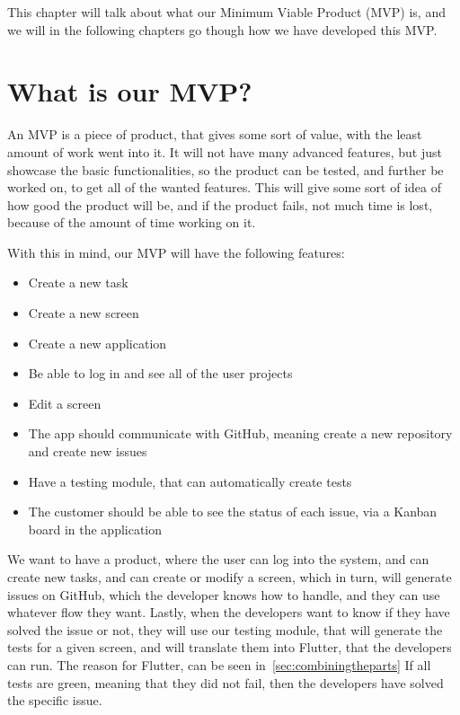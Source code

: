 This chapter will talk about what our Minimum Viable Product (MVP) is, and we will in the following chapters go though how we have developed this MVP.

\section{What is our MVP?}
An MVP is a piece of product, that gives some sort of value, with the least amount of work went into it.
It will not have many advanced features, but just showcase the basic functionalities, so the product can be tested, and further be worked on, to get all of the wanted features.
This will give some sort of idea of how good the product will be, and if the product fails, not much time is lost, because of the amount of time working on it. \cite{whatIsMVP}

With this in mind, our MVP will have the following features:

\begin{itemize}
    \item Create a new task
    \item Create a new screen
    \item Create a new application
    \item Be able to log in and see all of the user projects
    \item Edit a screen 
    \item The app should communicate with GitHub, meaning create a new repository and create new issues
    \item Have a testing module, that can automatically create tests
    \item The customer should be able to see the status of each issue, via a Kanban board in the application
\end{itemize}

We want to have a product, where the user can log into the system, and can create new tasks, and can create or modify a screen, which in turn, will generate issues on GitHub, which the developer knows how to handle, and they can use whatever flow they want.
Lastly, when the developers want to know if they have solved the issue or not, they will use our testing module, that will generate the tests for a given screen, and will translate them into Flutter, that the developers can run. The reason for Flutter, can be seen in~\autoref{sec:combiningtheparts} 
If all tests are green, meaning that they did not fail, then the developers have solved the specific issue.
